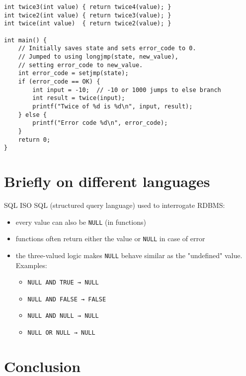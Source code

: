 \documentclass[aspectratio=169,14pt]{beamer}
\begin{document}
\begin{frame}[fragile]{}
\begin{lstlisting}[style=cstyle]
int twice3(int value) { return twice4(value); }
int twice2(int value) { return twice3(value); }
int twice(int value)  { return twice2(value); }

int main() {
    // Initially saves state and sets error_code to 0.
    // Jumped to using longjmp(state, new_value),
    // setting error_code to new_value.
    int error_code = setjmp(state);
    if (error_code == OK) {
        int input = -10;  // -10 or 1000 jumps to else branch
        int result = twice(input);
        printf("Twice of %d is %d\n", input, result);
    } else {
        printf("Error code %d\n", error_code);
    }
    return 0;
}
\end{lstlisting}
\end{frame}


\section{Briefly on different languages}
\begin{frame}{SQL}
ISO SQL (structured query language) used to interrogate RDBMS:
\begin{itemize}
    \item every value can also be \texttt{NULL} (in functions)
    \item functions often return either the value or \texttt{NULL} in case of error
    \item the three-valued logic makes \texttt{NULL} behave similar as the "undefined" value. Examples:
        \begin{itemize}
            \item \texttt{NULL AND  TRUE → NULL}
            \item \texttt{NULL AND FALSE → FALSE}
            \item \texttt{NULL AND  NULL → NULL}
            \item \texttt{NULL  OR  NULL → NULL}
        \end{itemize}
\end{itemize}
\end{frame}


\section{Conclusion}
\end{document}
